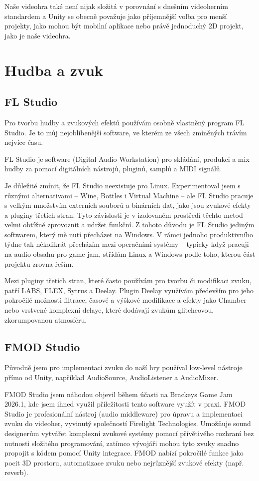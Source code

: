 Naše videohra také není nijak složitá v porovnání s dnešním videoherním standardem a Unity se obecně považuje jako příjemnější volba pro menší projekty, jako mohou být mobilní aplikace nebo právě jednoduchý 2D projekt, jako je naše videohra.

\section{Hudba a zvuk}

\subsection{FL Studio}
Pro tvorbu hudby a zvukových efektů používám osobně vlastněný program FL Studio. Je to můj nejoblíbenější software, ve kterém ze všech zmíněných trávím nejvíce času.

FL Studio je software (Digital Audio Workstation) pro skládání, produkci a mix hudby za pomocí digitálních nástrojů, pluginů, samplů a MIDI signálů.

Je důležité zmínit, že FL Studio neexistuje pro Linux. Experimentoval jsem s různými alternativami -- Wine, Bottles i Virtual Machine -- ale FL Studio pracuje s velkým množstvím externích souborů a binárních dat, jako jsou zvukové efekty a pluginy třetích stran. Tyto závislosti je v izolovaném prostředí těchto metod velmi obtížné zprovoznit a udržet funkční. Z tohoto důvodu je FL Studio jediným softwarem, který mě nutí přecházet na Windows. V rámci jednoho produktivního týdne tak několikrát přecházím mezi operačními systémy -- typicky když pracuji na audio obsahu pro game jam, střídám Linux a Windows podle toho, kterou část projektu zrovna řeším.

Mezi pluginy třetích stran, které často používám pro tvorbu či modifikaci zvuku, patří LABS, FLEX, Sytrus a Deelay. Plugin Deelay využívám především pro jeho pokročilé možnosti filtrace, časové a výškové modifikace a efekty jako Chamber nebo vrstvené komplexní delaye, které dodávají zvukům glitcheovou, zkorumpovanou atmosféru.

\subsection{FMOD Studio}
\label{sec:fmod-studio}
Původně jsem pro implementaci zvuku do naší hry používal low-level nástroje přímo od Unity, například AudioSource, AudioListener a AudioMixer.

FMOD Studio jsem náhodou objevil během účasti na Brackeys Game Jam 2026.1, kde jsem ihned využil příležitosti tento software využít v praxi. FMOD Studio je profesionální nástroj (audio middleware) pro úpravu a implementaci zvuku do videoher, vyvinutý společností Firelight Technologies. Umožňuje sound designerům vytvářet komplexní zvukové systémy pomocí přívětivého rozhraní bez nutnosti složitého programování, zatímco vývojáři mohou tyto zvuky snadno propojit s kódem pomocí Unity integrace. FMOD nabízí pokročilé funkce jako pocit 3D prostoru, automatizace zvuku nebo nejrůznější zvukové efekty (např. reverb).

